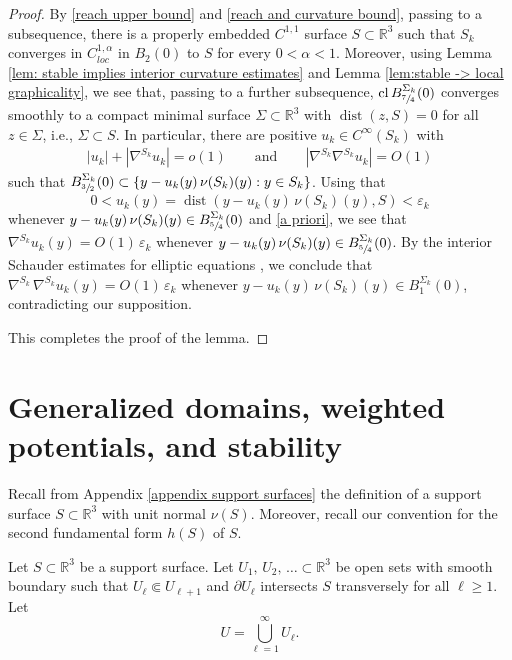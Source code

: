 \documentclass[11pt]{amsart}
\begin{document}
\begin{appendices}
\begin{proof}
		
	By \eqref{reach upper bound} and \eqref{reach and curvature bound}, passing to a subsequence, there is a properly embedded $C^{1,1}$ surface $S\subset \mathbb{R}^3$ 
	 such that $S_k$ converges in $C^{1,\alpha}_{loc}$ in $B_2(0)$ to    $ S$ for every $0<\alpha<1$. Moreover, using Lemma \ref{lem: stable implies interior curvature estimates} and Lemma \ref{lem:stable -> local graphicality}, we see that, passing to a further subsequence, $\operatorname{cl} B^{\Sigma_k}_{\sfrac74}(0)$ converges smoothly to a compact minimal surface $\Sigma\subset \mathbb{R}^3$ with $\operatorname{dist}(z,S)=0$ for all $z\in \Sigma$, i.e., $\Sigma\subset S$. In particular, there are positive $u_k \in C^\infty(S_k)$ with
		\begin{align} \label{a priori}
	|u_k|+|\nabla ^{S_k}u_k|=o(1)\qquad\text{and}\qquad 	|\nabla^{S_k}\nabla^{S_k}u_k|=O(1)
		\end{align}  such that $B^{\Sigma_k}_{\sfrac32}(0)\subset \{y- u_k(y)\,\nu(S_k)(y):y\in S_k\}$. Using that $$0<u_k(y)= \operatorname{dist}(y-u_k(y)\,\nu(S_k)(y),S)<\varepsilon_k$$ whenever $y-u_k(y)\,\nu(S_k)(y)\in B^{\Sigma_k}_{\sfrac54}(0)$ and \eqref{a priori}, we see that  $\nabla^{S_k} u_k(y)= O(1)\,\varepsilon_k$ whenever $y-u_k(y)\,\nu(S_k)(y)\in B^{\Sigma_k}_{\sfrac54}(0)$. By the interior Schauder estimates for elliptic equations \cite[Theorem 6.2]{GilbargTrudinger}, we conclude that $\nabla^{S_k}\,\nabla^{S_k} u_k(y)=O(1)\,\varepsilon_k$ whenever $y-u_k(y)\,\nu(S_k)(y)\in B^{\Sigma_k}_{1}(0)$, contradicting our supposition.
		
		
		This completes the proof of the lemma.
\end{proof}
\section{Generalized domains, weighted potentials, and stability}
\label{appendix: generalized domain}
	Recall from Appendix \ref{appendix support surfaces} the definition of a support surface $S\subset \mathbb{R}^3$ with unit normal $\nu(S)$. Moreover, recall  our convention for the second fundamental form $h(S)$ of $S$.


 Let $S\subset \mathbb{R}^3$ be a support surface. Let $U_1,\,U_2,\,\ldots\subset \mathbb{R}^3$ be open sets with smooth boundary such that $U_\ell\Subset U_{\ell+1}$ and  $\partial U_\ell$ intersects $S$ transversely for all  $\ell\geq 1$. Let
$$
U=\bigcup_{\ell=1}^\infty U_\ell.
$$


\end{appendices}
\end{document}
